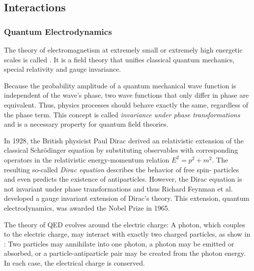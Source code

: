 \subsection{Interactions}
\subsubsection{Quantum Electrodynamics}
The theory of electromagnetism at extremely small or extremely high energetic scales is called . It is a field theory that unifies classical quantum mechanics, special relativity and gauge invariance.

Because the probability amplitude of a quantum mechanical wave function is independent of the wave's phase, two wave functions that only differ in phase are equivalent. Thus, physics processes should behave exactly the same, regardless of the phase term. This concept is called \emph{invariance under phase transformations} and is a necessary property for quantum field theories.

In 1928, the British physicist Paul Dirac derived an relativistic extension of the classical Schrödinger equation\cite{Dirac:quantumtheoryelectron} by substituting observables with corresponding operators in the relativistic energy-momentum relation $E^2 = p^2 + m^2$. The resulting so-called \emph{Dirac equation} describes the behavior of free spin- particles and even predicts the existence of antiparticles.
However, the Dirac equation is not invariant under phase transformations and thus Richard Feynman et al. developed a gauge invariant extension of Dirac's theory\cite{Feynman:Spacetimeapproach}. This extension, quantum electrodynamics, was awarded the Nobel Prize in 1965\cite{NobelMedia:NobelPrize1965}.

The theory of \ac{QED} evolves around the electric charge: A photon, which couples to the electric charge, may interact with exactly two charged particles, as show in : Two particles may annihilate into one photon, a photon may be emitted or absorbed, or a particle-antiparticle pair may be created from the photon energy. In each case, the electrical charge is conserved.

